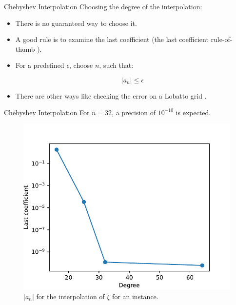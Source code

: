 \documentclass{beamer}
\begin{document}
\begin{frame}{Chebyshev Interpolation}
	Choosing the degree of the interpolation:
	
	\begin{itemize}
		\item There is no guaranteed way to choose it.
		\item A good rule is to examine the last coefficient (the last coefficient rule-of-thumb \cite[p~.50]{boyd:2001}).
		\item For a predefined $\epsilon$, choose $n$, such that:
		
		\begin{equation*}
		|a_n| \le \epsilon
		\end{equation*}
		
		\item There are other ways like checking the error on a Lobatto grid \cite{boyd:2007}.
	\end{itemize}
\end{frame}

\begin{frame}{Chebyshev Interpolation}
	For $n=32$, a precision of $10^{-10}$ is expected.
	
	\begin{figure}
		\centering
		
		\includegraphics[scale=.6]{error_coef}
		\caption{$|a_n|$ for the interpolation of $\xi$ for an instance.}
	\end{figure}
\end{frame}
\end{document}
